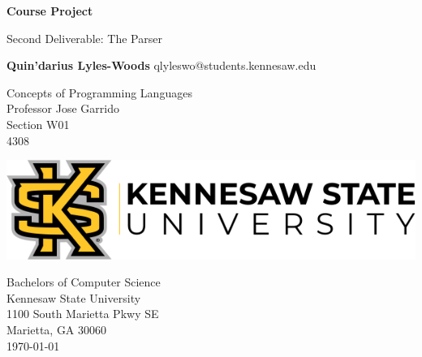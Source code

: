 \begin{titlepage}
\begin{center}
	\vspace*{1cm}

	\Huge
	\textbf{Course Project}

	\vspace{0.5cm}
	\LARGE
	Second Deliverable: The Parser	

	\vspace{1.5cm}

	\textbf{Quin'darius Lyles-Woods}
	\Large
	qlyleswo@students.kennesaw.edu

	\vfill
	\LARGE
	Concepts of Programming Languages	\\
	Professor Jose Garrido			\\
	Section W01 				\\
	4308
	\vspace{0.8cm}

	\includegraphics[width=\textwidth]{kennesawlogo}

	\vspace{0.8cm}

	\Large
	Bachelors of Computer Science\\
	Kennesaw State University\\
	1100 South Marietta Pkwy SE\\
	Marietta, GA 30060\\
	\today	

	\vspace{1cm}

\end{center}
\end{titlepage}

